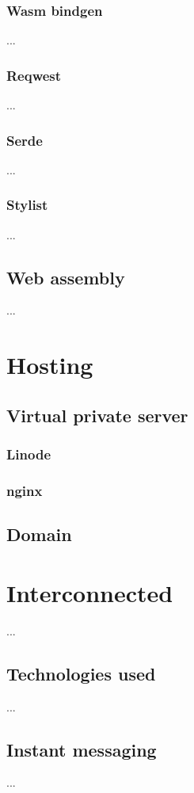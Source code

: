    \subsubsection{Wasm bindgen}
    ...
    \subsubsection{Reqwest}
    ...
    \subsubsection{Serde}
    ...
    \subsubsection{Stylist}
    ...
    
    
    \subsection{Web assembly}
    ...

    \section{Hosting}
    \subsection{Virtual private server}
    \subsubsection{Linode}
    \subsubsection{nginx}
    \subsection{Domain}
    
    \section{Interconnected}
    ...
    
    \subsection{Technologies used}
    ... 
    
    \subsection{Instant messaging}
    ...
    
